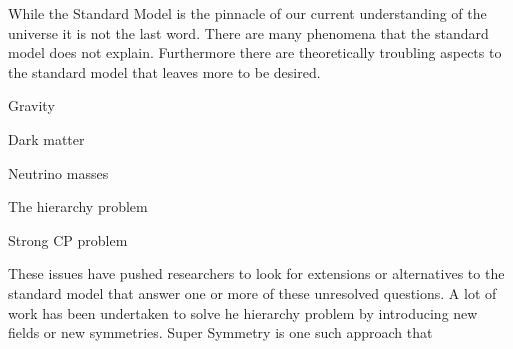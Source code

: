 
While the Standard Model is the pinnacle of our current understanding of the universe it is not the last word.
There are many phenomena that the standard model does not explain.
Furthermore there are theoretically troubling aspects to the standard model that leaves more to be desired.

Gravity

Dark matter

Neutrino masses

The hierarchy problem 

Strong CP problem

These issues have pushed researchers to look for extensions or alternatives to the standard model that answer one or more of these unresolved questions.
A lot of work has been undertaken to solve he hierarchy problem by introducing new fields or new symmetries.
Super Symmetry is one such approach that 


